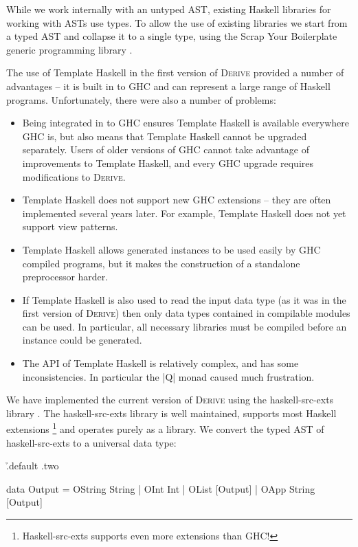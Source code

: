 \documentclass[preprint,draft]{sigplanconf}
\newcommand{\derive}{\textsc{Derive}}
\begin{document}
While we work internally with an untyped AST, existing Haskell libraries for working with ASTs use types. To allow the use of existing libraries we start from a typed AST and collapse it to a single type, using the Scrap Your Boilerplate generic programming library \cite{lammel:syb,lammel:syb2}.

The use of Template Haskell in the first version of \derive{} provided a number of advantages -- it is built in to GHC and can represent a large range of Haskell programs. Unfortunately, there were also a number of problems:

\begin{itemize}
\item Being integrated in to GHC ensures Template Haskell is available everywhere GHC is, but also means that Template Haskell cannot be upgraded separately. Users of older versions of GHC cannot take advantage of improvements to Template Haskell, and every GHC upgrade requires modifications to \derive{}.
\item Template Haskell does not support new GHC extensions -- they are often implemented several years later. For example, Template Haskell does not yet support view patterns.
\item Template Haskell allows generated instances to be used easily by GHC compiled programs, but it makes the construction of a standalone preprocessor harder.
\item If Template Haskell is also used to read the input data type (as it was in the first version of \derive{}) then only data types contained in compilable modules can be used. In particular, all necessary libraries must be compiled before an instance could be generated.
\item The API of Template Haskell is relatively complex, and has some inconsistencies. In particular the |Q| monad caused much frustration.
\end{itemize}

We have implemented the current version of \derive{} using the haskell-src-exts library \cite{haskell_src_exts}. The haskell-src-exts library is well maintained, supports most Haskell extensions \footnote{Haskell-src-exts supports even more extensions than GHC!} and operates purely as a library. We convert the typed AST of haskell-src-exts to a universal data type:

\h{.default .two}\begin{code}
data Output  =  OString String
             |  OInt Int
             |  OList [Output]
             |  OApp String [Output]
\end{code}
\end{document}
